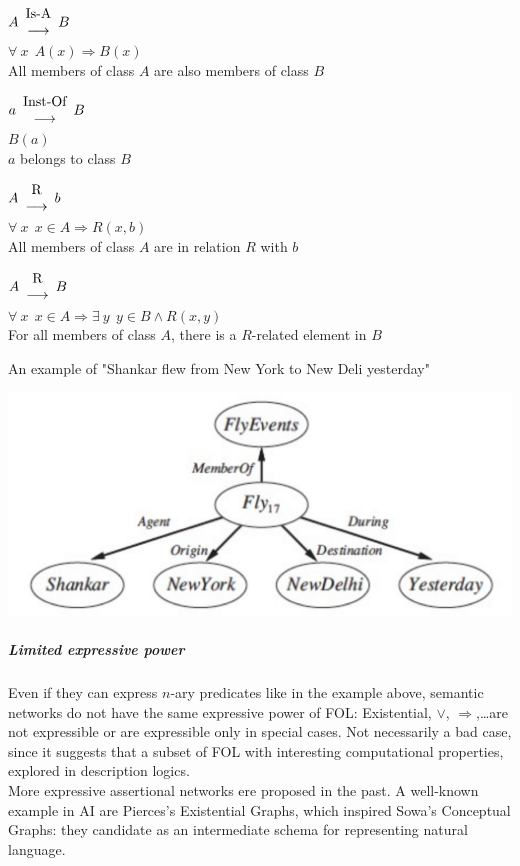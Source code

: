 \documentclass[10pt]{report}
\begin{document}
\begin{list}{}{}
	\item $A \begin{array}{c}
	\hbox{Is-A}\\\longrightarrow
	\end{array} B$\\
	$\forall\:x\:\:A(x)\Rightarrow B(x)$\\
	All members of class $A$ are also members of class $B$
	\item $a \begin{array}{c}
	\hbox{Inst-Of}\\\longrightarrow
	\end{array} B$\\
	$B(a)$\\
	$a$ belongs to class $B$
	\item $A \begin{array}{c}
	\hbox{R}\\\longrightarrow
	\end{array} b$\\
	$\forall\:x\:\:x\in A\Rightarrow R(x,b)$\\
	All members of class $A$ are in relation $R$ with $b$
	\item $A \begin{array}{c}
	\hbox{R}\\\longrightarrow
	\end{array} B$\\
	$\forall\:x\:\:x\in A\Rightarrow \exists\:y\:\:y\in B \wedge R(x,y)$\\
	For all members of class $A$, there is a $R$-related element in $B$
\end{list}
An example of "Shankar flew from New York to New Deli yesterday"
\begin{center}
	\includegraphics[scale=0.5]{18.png}
\end{center}
\subparagraph{Limited expressive power} Even if they can express $n$-ary predicates like in the example above, semantic networks do not have the same expressive power of FOL: Existential, $\vee$, $\Rightarrow$,\ldots are not expressible or are expressible only in special cases. Not necessarily a bad case, since it suggests that a subset of FOL with interesting computational properties, explored in description logics.\\
More expressive assertional networks ere proposed in the past. A well-known example in AI are Pierces's Existential Graphs, which inspired Sowa's Conceptual Graphs: they candidate as an intermediate schema for representing natural language.
\end{document}
